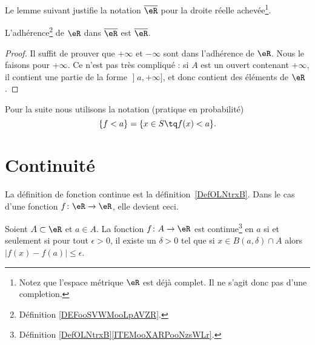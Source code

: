 Le lemme suivant justifie la notation \( \overline{ \eR }\) pour la droite réelle achevée\footnote{Notez que l'espace métrique \( \eR\) est déjà complet. Il ne s'agit donc pas d'une completion.}.
\begin{lemma}       \label{LEMooPZXHooEEXsTC}
	L'adhérence\footnote{Définition \ref{DEFooSVWMooLpAVZR}.} de \( \eR\) dans \( \overline{ \eR }\) est \( \overline{ \eR }\).
\end{lemma}

\begin{proof}
	Il suffit de prouver que \( +\infty\) et \( -\infty\) sont dans l'adhérence de \( \eR\). Nous le faisons pour \( +\infty\). Ce n'est pas très compliqué : si \( A\) est un ouvert contenant \( +\infty\), il contient une partie de la forme \( \mathopen] a , +\infty \mathclose]\), et donc contient des éléments de \( \eR\).
\end{proof}

Pour la suite nous utilisons la notation (pratique en probabilité)
\begin{equation}
	\{ f<a \}=\{ x\in S\tq f(x)<a \}.
\end{equation}


\section{Continuité}

La définition de fonction continue est la définition~\ref{DefOLNtrxB}. Dans le cas d'une fonction \( f\colon \eR\to \eR\), elle devient ceci.
\begin{proposition}      \label{PROPooVNGEooPwbxXP}
	Soient \( A\subset \eR\) et \( a\in A\). La fonction \( f\colon A\to \eR\) est continue\footnote{Définition \ref{DefOLNtrxB}\ref{ITEMooXARPooNzsWLr}.} en \( a\) si et seulement si pour tout \( \epsilon>0\), il existe un \( \delta>0\) tel que si \( x\in B(a,\delta)\cap A\) alors \( | f(x)-f(a) |\leq \epsilon\).
\end{proposition}

